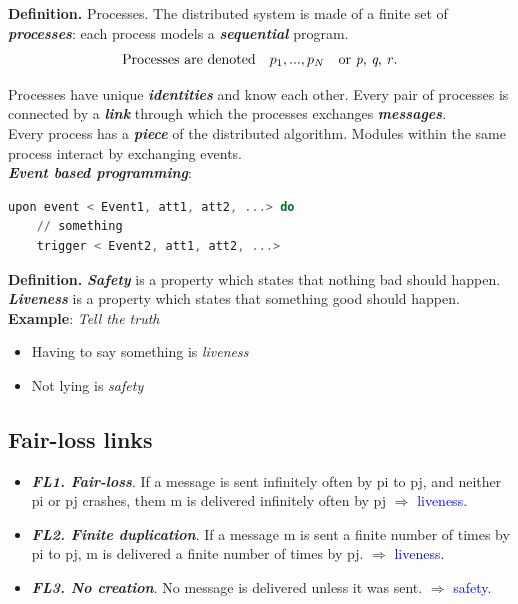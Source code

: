 \documentclass[11pt]{article}
\begin{document}
\begin{tcolorbox}[
    enhanced,
    frame hidden,
    borderline west={2pt}{0pt}{black},
    boxsep=5pt,
    left=8pt
]
\textbf{Definition.} Processes. The distributed system is made of a finite set of \textit{\textbf{processes}}: each process models a \textbf{\textit{sequential}} program.
\[
	\text{Processes are denoted} \quad  p_1, ..., p_N \quad \text{or \textit{p}, \textit{q}, \textit{r}}
.\] 

Processes have unique \textbf{\textit{identities}} and know each other. Every pair of processes is connected by a \textbf{\textit{link}} through which the processes exchanges \textbf{\textit{messages}}. \\

Every process has a \textbf{\textit{piece}} of the distributed algorithm. Modules within the same process interact by exchanging events.\\

\textbf{\textit{Event based programming}}:
\begin{lstlisting}[language=Octave]
upon event < Event1, att1, att2, ...> do 
	// something
	trigger < Event2, att1, att2, ...>
\end{lstlisting}
\end{tcolorbox}

\begin{tcolorbox}[
    enhanced,
    frame hidden,
    borderline west={2pt}{0pt}{black},
    boxsep=5pt,
    left=8pt
]
\textbf{Definition.} \textbf{\textit{Safety}} is a property which states that nothing bad should happen. \textbf{\textit{Liveness}} is a property which states that something good should happen. \\

\textbf{Example}: \textit{Tell the truth}
\begin{itemize}
	\item Having to say something is \textit{liveness}
	\item Not lying is \textit{safety}
\end{itemize}
\end{tcolorbox}

\subsection*{Fair-loss links}
\begin{itemize}
	\item \textbf{\textit{FL1. Fair-loss}}. If a message is sent infinitely often by pi to pj, and neither pi or pj crashes, them m is delivered infinitely often by pj $\Rightarrow$ \textcolor{blue}{liveness}.
	\item \textit{\textbf{FL2. Finite duplication}}. If a message m is sent a finite number of times by pi to pj, m is delivered a finite number of times by pj. $\Rightarrow$ \textcolor{blue}{liveness}. 
	\item \textbf{\textit{FL3. No creation}}. No message is delivered unless it was sent. $\Rightarrow$ \textcolor{blue}{safety}.
\end{itemize}
\end{document}
